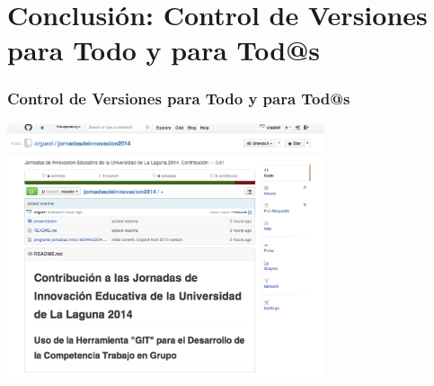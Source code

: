 \documentclass{beamer}
\begin{document}
\section{Conclusión: Control de Versiones para Todo y para Tod@s}
\begin{frame}
\frametitle{Control de Versiones para Todo y para Tod@s}

\begin{center}
    \includegraphics[width=0.7\textwidth]{img/estacontribucion.eps}
\end{center}
\end{frame}
\end{document}

